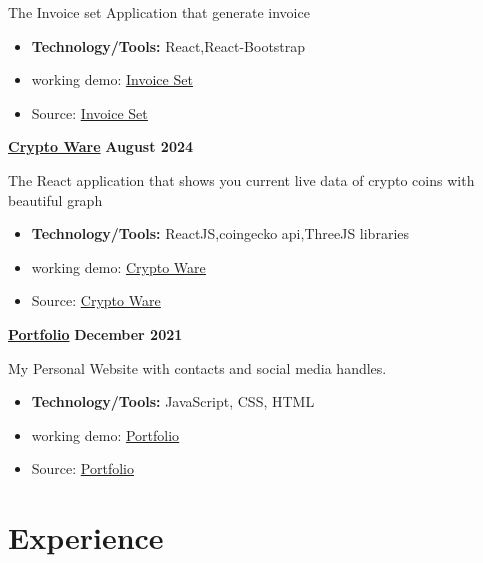 \documentclass[letterpaper, 11pt]{article}
\newcommand{\bulletSpace}{\vspace{-8pt}}
\newcommand{\secStartSpace}{\vspace{3pt}}
\newcommand{\secEndSpace}{\vspace{5pt}}
\newcommand{\spaceCollapse}{\vspace{-5pt}}
\begin{document}
\begin{addmargin}[1em]{1em}
	\noindent The Invoice set Application that generate invoice
	\spaceCollapse
	\begin{itemize}
		\item \textbf{Technology/Tools:} React,React-Bootstrap
		      \bulletSpace
            	\item working demo:  \href{https://invoiceset.netlify.app/}
  {\underline{Invoice Set}}
		\item Source:  \href{https://github.com/sukhlotey/invoice-set}
  {\underline{Invoice Set}}
	\end{itemize}
	
 \newpage
	\noindent\href{https://github.com/sukhlotey/Crypto-Ware}{\textbf{Crypto Ware}}  \hfill \textbf{August 2024} 
		
	\noindent The React application that shows you current live data of crypto coins with beautiful graph
	\spaceCollapse
	\begin{itemize}
		\item \textbf{Technology/Tools:} ReactJS,coingecko api,ThreeJS libraries
		      \bulletSpace
		\item working demo:  \href{https://cryptowarehouse.netlify.app/}{\underline{Crypto Ware}}
           \item Source:  \href{https://github.com/sukhlotey/Crypto-Ware}{\underline{Crypto Ware}}
	\end{itemize}
	\noindent\href{https://github.com/sukhlotey/imSukhpreet}{\textbf{Portfolio}}  \hfill \textbf{December 2021} 
		
	\noindent My Personal Website with contacts and social media handles.
	\spaceCollapse
	\begin{itemize}
		\item \textbf{Technology/Tools:} JavaScript, CSS, HTML
		      \bulletSpace
		\item working demo:  \href{https://sukhlotey.github.io/imSukhpreet/}{\underline{Portfolio}}
           \item Source:  \href{https://github.com/sukhlotey/imSukhpreet}{\underline{Portfolio}}
	\end{itemize}
		
\end{addmargin}
\secEndSpace
\section{\color{blue} \textbf{Experience}}
\secStartSpace
\end{document}
